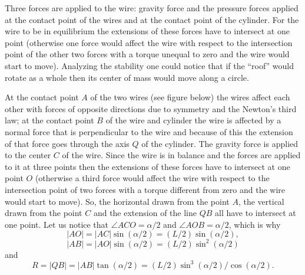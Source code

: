 {\ifEngHint
Three forces are applied to the wire: gravity force and the pressure forces applied at the contact point of the wires and at the contact point of the cylinder. For the wire to be in equilibrium the extensions of these forces have to intersect at one point (otherwise one force would affect the wire with respect to the intersection point of the other two forces with a torque unequal to zero and the wire would start to move). Analyzing the stability one could notice that if the “roof” would rotate as a whole then its center of mass would move along a circle.
\fi


\ifEngSolution
At the contact point $A$ of the two wires (see figure below) the wires affect each other with forces of opposite directions due to symmetry and the Newton’s third law; at the contact point $B$ of the wire and cylinder the wire is affected by a normal force that is perpendicular to the wire and because of this the extension of that force goes through the axis $Q$ of the cylinder. The gravity force is applied to the center $C$ of the wire. Since the wire is in balance and the forces are applied to it at three points then the extensions of these forces have to intersect at one point $O$ (otherwise a third force would affect the wire with respect to the intersection point of two forces with a torque different from zero and the wire would start to move). So, the horizontal drawn from the point $A$, the vertical drawn from the point $C$ and the extension of the line $QB$ all have to intersect at one point. Let us notice that $\angle ACO=\alpha/2$ and $\angle AOB=\alpha/2$, which is why
$$|AO|=|AC|\sin(\alpha/2)=(L/2)\sin(\alpha/2),$$
$$|AB|=|AO|\sin(\alpha/2)=(L/2)\sin^2(\alpha/2)$$
and
$$R=|QB|=|AB|\tan(\alpha/2)=(L/2)\sin^3(\alpha/2)/\cos(\alpha/2).$$
\begin{center}
\end{center}

}
